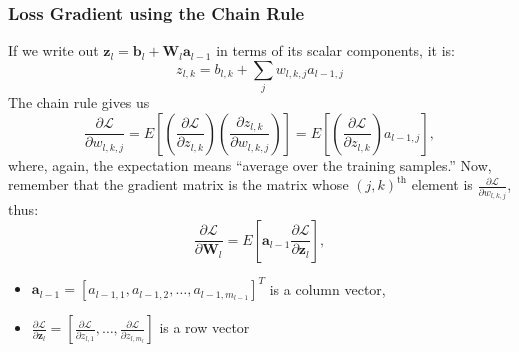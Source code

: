 \documentclass{beamer}
\begin{document}
\begin{frame}
  \frametitle{Loss Gradient using the Chain Rule}

  If we write out
  $\mathbf{z}_l=\mathbf{b}_l+\mathbf{W}_l\mathbf{a}_{l-1}$ in terms of
  its scalar components, it is:
  \begin{displaymath}
    z_{l,k} = b_{l,k}+\sum_j w_{l,k,j}a_{l-1,j}
  \end{displaymath}
  The chain rule gives us
  \begin{displaymath}
    \frac{\partial\mathcal{L}}{\partial w_{l,k,j}}=
    E\left[\left(\frac{\partial\mathcal{L}}{\partial z_{l,k}}\right)
      \left(\frac{\partial z_{l,k}}{\partial w_{l,k,j}}\right)\right]=
    E\left[\left(\frac{\partial\mathcal{L}}{\partial z_{l,k}}\right)a_{l-1,j}\right],
  \end{displaymath}
  where, again, the expectation means ``average over the training
  samples.''  Now, remember that the gradient matrix is the matrix
  whose $(j,k)^{\text{th}}$ element is
  $\frac{\partial\mathcal{L}}{\partial w_{l,k,j}}$, thus:
  \begin{displaymath}
    \frac{\partial\mathcal{L}}{\partial\mathbf{W}_{l}}=
    E\left[\mathbf{a}_{l-1}\frac{\partial\mathcal{L}}{\partial\mathbf{z}_l}\right],
  \end{displaymath}
  \begin{itemize}
  \item $\mathbf{a}_{l-1}=[a_{l-1,1},a_{l-1,2},\ldots,a_{l-1,m_{l-1}}]^T$ is a column vector,
  \item $\frac{\partial\mathcal{L}}{\partial\mathbf{z}_l}=[\frac{\partial\mathcal{L}}{\partial z_{l,1}},\ldots,\frac{\partial\mathcal{L}}{\partial z_{l,m_l}}]$ is a row vector
  \end{itemize}
\end{frame}
\end{document}
